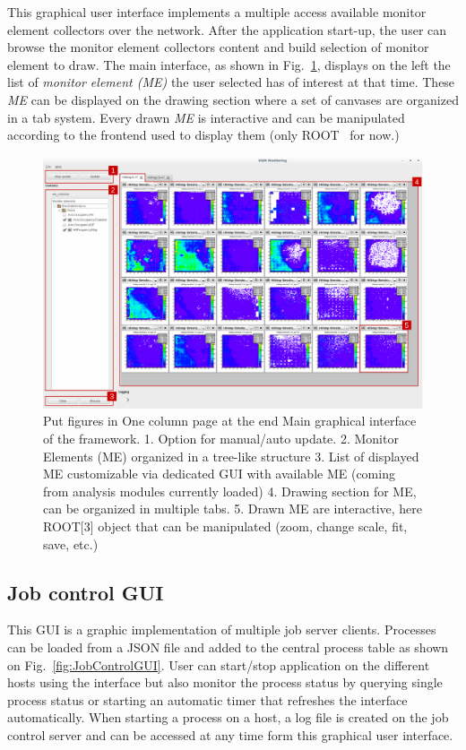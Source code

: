\documentclass[conference]{IEEEtran}
\begin{document}
This graphical user interface implements a multiple access available monitor element collectors over the network. After the application start-up, the user can browse the monitor element collectors content and build selection of monitor element to draw. The main interface, as shown in Fig.~\ref{fig:DQMMainViz}, displays on the left the list of \textit{monitor element (ME)} the user selected has of interest at that time. These \textit{ME} can be displayed on the drawing section where a set of canvases are organized in a tab system. Every drawn \textit{ME} is interactive and can be manipulated according to the frontend used to display them (only ROOT~\cite{ROOT} for now.)
\begin{figure}[p]
  \begin{center}
    \includegraphics[width=0.8\linewidth]{figs/MaintInterfaceGUI.pdf}
    \caption{\label{fig:DQMMainViz} {\color{red}Put figures in One column page at the end}
    Main graphical interface of the framework.
    1. Option for manual/auto update.
    2. Monitor Elements (ME) organized in a tree-like structure
    3. List of displayed ME customizable via dedicated GUI with available ME (coming from analysis modules currently loaded)
    4. Drawing section for ME, can be organized in multiple tabs.
    5. Drawn ME are interactive, here ROOT[3] object that can be manipulated (zoom, change scale, fit, save, etc.)
    }
  \end{center}
\end{figure}

\subsection{Job control GUI}

This GUI is a graphic implementation of multiple job server clients. Processes can be loaded from a JSON file and added to the central process table as shown on Fig.~\ref{fig:JobControlGUI}. User can start/stop application on the different hosts using the interface but also monitor the process status by querying single process status or starting an automatic timer that refreshes the interface automatically. When starting a process on a host, a log file is created on the job control server and can be accessed at any time form this graphical user interface.
\end{document}
